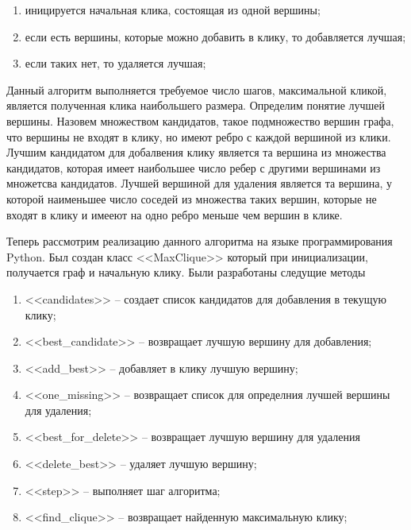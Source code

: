 \begin{enumerate}
    \item иницируется начальная клика, состоящая из одной вершины;
    \item если есть вершины, которые можно добавить в клику, то добавляется лучшая;
    \item если таких нет, то удаляется лучшая;
\end{enumerate}

Данный алгоритм выполняется требуемое число шагов,
максимальной кликой, является полученная клика наибольшего размера.
Определим понятие лучшей вершины. Назовем множеством
кандидатов, такое подмножество вершин графа, что
вершины не входят в клику, но имеют ребро с каждой вершиной из клики.
Лучшим кандидатом для добалвения клику является та вершина из 
множества кандидатов, которая имеет наибольшее число ребер с
другими вершинами из множетсва кандидатов. 
Лучшей вершиной для удаления является та вершина, у которой 
наименьшее число соседей из множества таких вершин,
которые не входят в клику и имееют на одно ребро меньше чем вершин в клике.

Теперь рассмотрим реализацию данного алгоритма на языке программирования
Python. Был создан класс <<MaxClique>> который при инициализации,
получается граф и начальную клику. Были разработаны следущие методы
\begin{enumerate}
    \item  <<candidates>> -- создает список кандидатов для
        добавления в текущую клику;
    \item <<best\_candidate>> -- возвращает лучшую вершину для добавления;
    \item <<add\_best>> -- добавляет в клику лучшую вершину;
    \item <<one\_missing>> -- возвращает список для определния лучшей
        вершины для удаления;
    \item <<best\_for\_delete>> -- возвращает лучшую вершину для удаления
    \item <<delete\_best>> -- удаляет лучшую вершину;
    \item <<step>> -- выполняет шаг алгоритма;
    \item <<find\_clique>> -- возвращает найденную максимальную клику;
\end{enumerate}

